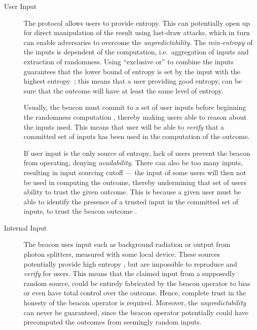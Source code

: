\begin{description}
    \item[User Input]
        The protocol allows users to provide entropy.
        This can potentially open up for direct manipulation of the result using last-draw attacks, which in turn can enable adversaries to overcome the \emph{unpredictability}.
        The \emph{min-entropy} of the inputs is dependent of the computation, i.e.\ aggregation of inputs and extraction of randomness.
        Using \enquote{exclusive or} to combine the inputs guarantees that the lower bound of entropy is set by the input with the highest entropy~\cite{lenstra2015random};
        this means that a user providing good entropy, can be sure that the outcome will have at least the same level of entropy.

        Usually, the beacon must commit to a set of user inputs before beginning the randomness computation , thereby making users able to reason about the inputs used.
        This means that user will be able to \emph{verify} that a committed set of inputs has been used in the computation of the outcome.

        If user input is the only source of entropy, lack of users prevent the beacon from operating, denying \emph{availability}.
        There can also be too many inputs, resulting in input sourcing cutoff ---
        the input of some users will then not be used in computing the outcome, thereby undermining that set of users ability to trust the given outcome.
        This is because a given user must be able to identify the presence of a trusted input in the committed set of inputs, to trust the beacon outcome .

    \item[Internal Input]
        The beacon uses input such as background radiation or output from photon splitters, measured with some local device.
        These sources potentially provide high entropy , but are impossible to reproduce and \emph{verify} for users.
        This means that the claimed input from a supposedly random source, could be entirely fabricated by the beacon operator to bias or even have total control over the outcome.
        Hence, complete trust in the honesty of the beacon operator is required.
        Moreover, the \emph{unpredictability} can never be guaranteed, since the beacon operator potentially could have precomputed the outcomes from seemingly random inputs.


\end{description}

